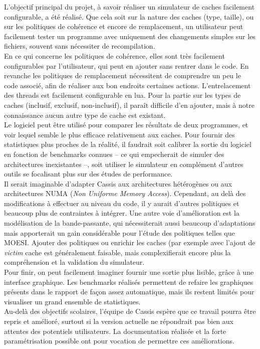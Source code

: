 L'objectif principal du projet, à savoir réaliser un simulateur de caches facilement configurable, a été réalisé. Que cela soit sur la nature des caches (type, taille), ou sur les politiques de cohérence et encore de remplacement, un utilisateur peut facilement tester un programme avec uniquement des changements simples sur les fichiers, souvent sans nécessiter de recompilation. \\

En ce qui concerne les politiques de cohérence, elles sont très facilement configurables par l'utilisateur, qui peut en ajouter sans rentrer dans le code. En revanche les politiques de remplacement nécessitent de comprendre un peu le code associé, afin de réaliser aux bon endroits certaines actions. L'entrelacement des threads est facilement configurable en lua. Pour la partie sur les types de caches (inclusif, exclusif, non-inclusif), il paraît difficile d'en ajouter, mais à notre connaissance aucun autre type de cache est existant.\\

Le logiciel peut être utilisé pour comparer les résultats de deux programmes, et voir lequel semble le plus efficace relativement aux caches. Pour fournir des statistiques plus proches de la réalité, il faudrait soit calibrer la sortie du logiciel en fonction de benchmarks connues -- ce qui empecherait de simuler des architectures inexistantes --, soit utiliser le simulateur en complément d'autres outils se focalisant plus sur des études de performance.\\

Il serait imaginable d'adapter \textsf{Cassis} aux architectures hétérogènes ou aux architectures NUMA (\emph{Non Uniforme Memory Access}). Cependant, au delà des modifications à effectuer au niveau du code, il y aurait d'autres politiques et beaucoup plus de contraintes à intégrer. Une autre voie d'amélioration est la modélisation de la bande-passante, qui nécessiterait aussi beaucoup d'adaptations mais apporterait un gain considérable pour l'étude des politiques telles que MOESI. Ajouter des politiques ou enrichir les caches (par exemple avec l'ajout de \emph{victim} cache est généralement faisable, mais complexifierait encore plus la compréhension et la validation du simulateur.\\

Pour finir, on peut facilement imaginer fournir une sortie plus lisible, grâce à une interface graphique. Les benchmarks réalisés permettent de refaire les graphiques présents dans le rapport de façon assez automatique, mais ils restent limités pour visualiser un grand ensemble de statistiques. \\

Au-delà des objectifs scolaires, l'équipe de \textsf{Cassis} espère que ce travail pourra être repris et amélioré, surtout si la version actuelle ne répondrait pas bien aux attentes des potentiels utilisateurs. La documentation réalisée et la forte paramétrisation possible ont pour vocation de permettre ces améliorations.
